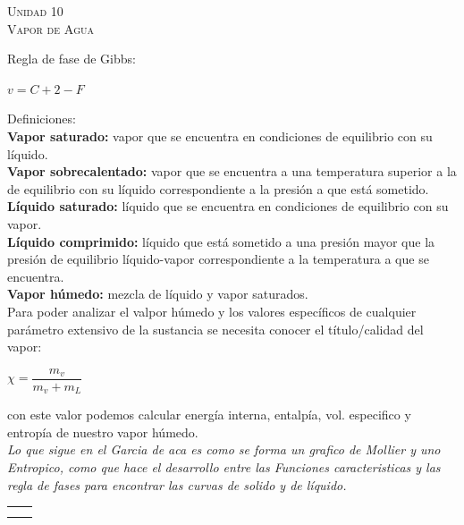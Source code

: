 \documentclass[11pt,a4paper,twocolumn]{article}
\newcommand{\unidad}[2]{\begin{center}
		\fontsize{10}{10}\selectfont\color{gray!50!black}\scshape Unidad #1 \\
		\fontsize{14}{14}\selectfont \scshape #2
\end{center}}
\begin{document}
	\unidad{10}{Vapor de Agua}
	Regla de fase de Gibbs:
	\begin{center}
		$v=C+2-F$\\
	\end{center}	
	Definiciones:\\
	\textbf{Vapor saturado:} vapor que se encuentra en condiciones de equilibrio con su líquido.\\
	\textbf{Vapor sobrecalentado:} vapor que se encuentra a una temperatura superior a la de equilibrio con su líquido correspondiente a la presión a que está sometido.\\
	\textbf{Líquido saturado:} líquido que se encuentra en condiciones de equilibrio con su vapor.\\
	\textbf{Líquido comprimido:} líquido que está sometido a una presión mayor que la presión de equilibrio líquido-vapor correspondiente a la temperatura a que se encuentra.\\
	\textbf{Vapor húmedo:} mezcla de líquido y vapor saturados.\\
	
	Para poder analizar el valpor húmedo y los valores específicos de cualquier parámetro extensivo de la sustancia se necesita conocer el título/calidad del vapor:
	\begin{center}
		$\chi=\dfrac{m_{v}}{m_{v}+m_{L}}$\\
	\end{center}
	con este valor podemos calcular energía interna, entalpía, vol. especifico y entropía de nuestro vapor húmedo.	\\
	\textit{Lo que sigue en el Garcia de aca es como se forma un grafico de Mollier y uno Entropico, como que hace el desarrollo entre las Funciones caracteristicas y las regla de fases para encontrar las curvas de solido y de líquido.}
	
	
	
	
	\begin{tabular}{r | l} \vspace{.2cm}
		& \\ \vspace{.2cm}
		& \\ 
		
	\end{tabular}
	
\end{document}
